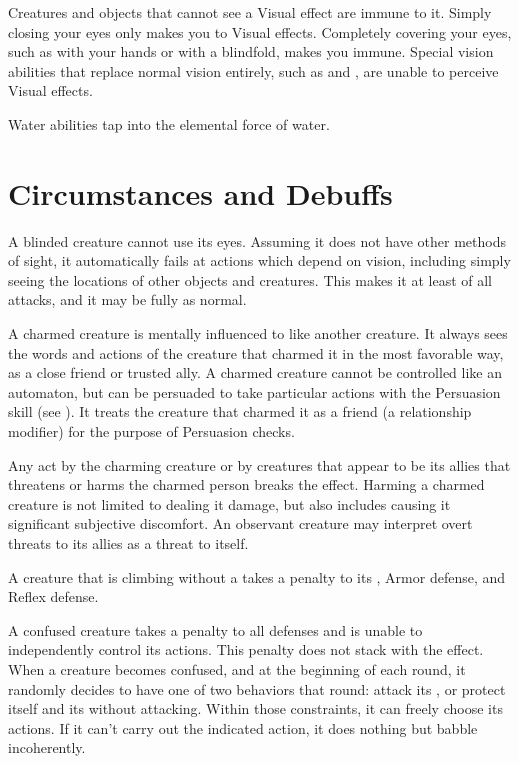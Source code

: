   Creatures and objects that cannot see a Visual effect are immune to it.
  Simply closing your eyes only makes you \impervious to Visual effects.
  Completely covering your eyes, such as with your hands or with a blindfold, makes you immune.
  Special vision abilities that replace normal vision entirely, such as  and , are unable to perceive Visual effects.

   Water abilities tap into the elemental force of water.

  \newpage
\section{Circumstances and Debuffs}\label{Circumstances and Debuffs}

   A blinded creature cannot use its eyes.
  Assuming it does not have other methods of sight, it automatically fails at actions which depend on vision, including simply seeing the locations of other objects and creatures.
  This makes it at least \partiallyunaware of all attacks, and it may be fully \unaware as normal.

   A charmed creature is mentally influenced to like another creature.
  It always sees the words and actions of the creature that charmed it in the most favorable way, as a close friend or trusted ally.
  A charmed creature cannot be controlled like an automaton, but can be persuaded to take particular actions with the Persuasion skill (see ).
  It treats the creature that charmed it as a friend (a  relationship modifier) for the purpose of Persuasion checks.

  Any act by the charming creature or by creatures that appear to be its allies that threatens or harms the charmed person breaks the effect.
  Harming a charmed creature is not limited to dealing it damage, but also includes causing it significant subjective discomfort.
  An observant creature may interpret overt threats to its allies as a threat to itself.

   A creature that is climbing without a  takes a  penalty to its , Armor defense, and Reflex defense.

   A confused creature takes a  penalty to all defenses and is unable to independently control its actions.
  This penalty does not stack with the \stunned effect.
  When a creature becomes confused, and at the beginning of each round, it randomly decides to have one of two behaviors that round: attack its , or protect itself and its  without attacking.
  Within those constraints, it can freely choose its actions.
  If it can't carry out the indicated action, it does nothing but babble incoherently.

